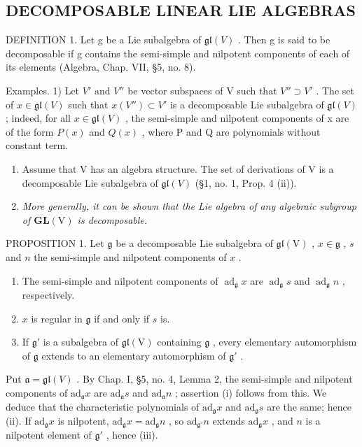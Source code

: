 \subsection{DECOMPOSABLE LINEAR LIE ALGEBRAS}

DEFINITION 1. Let g be a Lie subalgebra of \(\mathfrak{gl}(V)\) . Then g is said to be decomposable if g contains the semi-simple and nilpotent components of each of its elements (Algebra, Chap. VII, §5, no. 8).

Examples. 1) Let \(V'\) and \(V''\) be vector subspaces of V such that \(V'' \supset V'\) . The set of \(x \in \mathfrak{gl}(V)\) such that \(x(V'') \subset V'\) is a decomposable Lie subalgebra of \(\mathfrak{gl}(V)\) ; indeed, for all \(x \in \mathfrak{gl}(V)\) , the semi-simple and nilpotent components of x are of the form \(P(x)\) and \(Q(x)\) , where P and Q are polynomials without constant term.

\begin{enumerate}
\def\labelenumi{\arabic{enumi})}
\setcounter{enumi}{1}
\item
  Assume that V has an algebra structure. The set of derivations of V is a decomposable Lie subalgebra of \(\mathfrak{gl}(V)\) (§1, no. 1, Prop. 4 (ii)).
\item
  \emph{More generally, it can be shown that the Lie algebra of any algebraic subgroup of \(\mathbf{GL}(\mathrm{V})\) is decomposable.}
\end{enumerate}

PROPOSITION 1. Let \(\mathfrak{g}\) be a decomposable Lie subalgebra of \(\mathfrak{gl}(\mathrm{V})\) , \(x \in \mathfrak{g}\) , \(s\) and \(n\) the semi-simple and nilpotent components of \(x\) .

\begin{enumerate}
\def\labelenumi{(\roman{enumi})}
\item
  The semi-simple and nilpotent components of \(\operatorname{ad}_{\mathfrak{g}}x\) are \(\operatorname{ad}_{\mathfrak{g}}s\) and \(\operatorname{ad}_{\mathfrak{g}}n\) , respectively.
\item
  \(x\) is regular in \(\mathfrak{g}\) if and only if \(s\) is.
\item
  If \(\mathfrak{g}'\) is a subalgebra of \(\mathfrak{gl}(\mathrm{V})\) containing \(\mathfrak{g}\) , every elementary automorphism of \(\mathfrak{g}\) extends to an elementary automorphism of \(\mathfrak{g}'\) .
\end{enumerate}

Put \(\mathfrak{a} = \mathfrak{gl}(V)\) . By Chap. I, §5, no. 4, Lemma 2, the semi-simple and nilpotent components of \(\mathrm{ad}_{\mathfrak{a}}x\) are \(\mathrm{ad}_{\mathfrak{a}}s\) and \(\mathrm{ad}_{\mathfrak{a}}n\) ; assertion (i) follows from this. We deduce that the characteristic polynomials of \(\mathrm{ad}_{\mathfrak{g}}x\) and \(\mathrm{ad}_{\mathfrak{g}}s\) are the same; hence (ii). If \(\mathrm{ad}_{\mathfrak{g}}x\) is nilpotent, \(\mathrm{ad}_{\mathfrak{g}}x = \mathrm{ad}_{\mathfrak{g}}n\) , so \(\mathrm{ad}_{\mathfrak{g}'}n\) extends \(\mathrm{ad}_{\mathfrak{g}}x\) , and \(n\) is a nilpotent element of \(\mathfrak{g}'\) , hence (iii).

